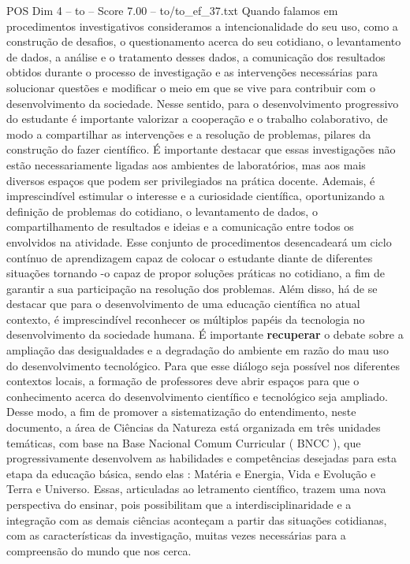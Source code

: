 \begin{textsample}{POS Dim 4 – to – Score 7.00 – to/to\_ef\_37.txt}
Quando falamos em procedimentos investigativos consideramos a intencionalidade do seu uso, como a construção de desafios, o questionamento acerca do seu cotidiano, o levantamento de dados, a análise e o tratamento desses dados, a comunicação dos resultados obtidos durante o processo de investigação e as intervenções necessárias para solucionar questões e modificar o meio em que se vive para contribuir com o desenvolvimento da sociedade.
Nesse sentido, para o desenvolvimento progressivo do estudante é importante valorizar a cooperação e o trabalho colaborativo, de modo a compartilhar as intervenções e a resolução de problemas, pilares da construção do fazer científico.
É importante destacar que essas investigações não estão necessariamente ligadas aos ambientes de laboratórios, mas aos mais diversos espaços que podem ser privilegiados na prática docente.
Ademais, é imprescindível estimular o interesse e a curiosidade científica, oportunizando a definição de problemas do cotidiano, o levantamento de dados, o compartilhamento de resultados e ideias e a comunicação entre todos os envolvidos na atividade.
Esse conjunto de procedimentos desencadeará um ciclo contínuo de aprendizagem capaz de colocar o estudante diante de diferentes situações tornando -o capaz de propor soluções práticas no cotidiano, a fim de garantir a sua participação na resolução dos problemas.
Além disso, há de se destacar que para o desenvolvimento de uma educação científica no atual contexto, é imprescindível reconhecer os múltiplos papéis da tecnologia no desenvolvimento da sociedade humana.
É importante \textbf{recuperar} o debate sobre a ampliação das desigualdades e a degradação do ambiente em razão do mau uso do desenvolvimento tecnológico.
Para que esse diálogo seja possível nos diferentes contextos locais, a formação de professores deve abrir espaços para que o conhecimento acerca do desenvolvimento científico e tecnológico seja ampliado.
Desse modo, a fim de promover a sistematização do entendimento, neste documento, a área de Ciências da Natureza está organizada em três unidades temáticas, com base na Base Nacional Comum Curricular ( BNCC ), que progressivamente desenvolvem as habilidades e competências desejadas para esta etapa da educação básica, sendo elas : Matéria e Energia, Vida e Evolução e Terra e Universo.
Essas, articuladas ao letramento científico, trazem uma nova perspectiva do ensinar, pois possibilitam que a interdisciplinaridade e a integração com as demais ciências aconteçam a partir das situações cotidianas, com as características da investigação, muitas vezes necessárias para a compreensão do mundo que nos cerca.

\end{textsample}
